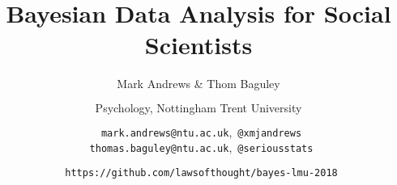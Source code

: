 \documentclass{slides}
\title[Teaching Bayes]{Bayesian Data Analysis for Social Scientists}
\author[Andrews]{Mark Andrews \& Thom Baguley \\ 
$\phantom{foo}$ \\ 
Psychology, Nottingham Trent University \\ 
$\phantom{foo}$ \\ 
\faEnvelopeO \  \texttt{mark.andrews@ntu.ac.uk},\  \faTwitter \texttt{@xmjandrews} \\ 
\faEnvelopeO \  \texttt{thomas.baguley@ntu.ac.uk},\ \faTwitter \texttt{@seriousstats}  \\ 
$\phantom{foo}$ \\ \faGithub \ \texttt{https://github.com/lawsofthought/bayes-lmu-2018}}
\date{}
\begin{document}
{
	\begin{frame}
		\titlepage
	\end{frame}
}




\end{document}
